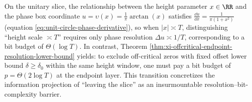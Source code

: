 \label{subsec:xi-certificate-coherence-orthogonal-axis-capacity-part2}

\begin{remark}\label{rem:xi-unitary-vs-offcritical-bit-gap}
On the unitary slice, the relationship between the height parameter \(x\in\RR\) and the phase box coordinate \(u=\upsilon(x)=\frac{1}{\pi}\arctan(x)\) satisfies
\(
\frac{\dd u}{\dd x}=\frac{1}{\pi(1+x^2)}
\)
(equation \eqref{eq:unit-circle-phase-derivative}), so when \(|x|\asymp T\), distinguishing ``height scale \(\asymp T\)'' requires only phase resolution \(\Delta u\asymp 1/T\), corresponding to a bit budget of \(\Theta(\log T)\).
In contrast, Theorem \ref{thm:xi-offcritical-endpoint-resolution-lower-bound} yields: to exclude off-critical zeros with fixed offset lower bound \(\delta\ge\delta_0\) within the same height window, one must pay a bit budget of \(p=\Theta(2\log T)\) at the endpoint layer.
This transition concretizes the information projection of ``leaving the slice'' as an insurmountable resolution--bit-complexity barrier.
\end{remark}

